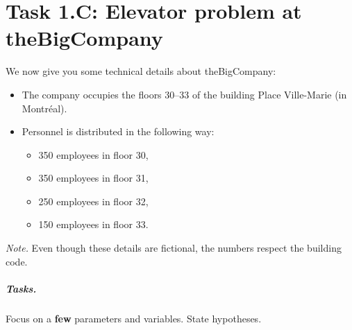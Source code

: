 %
%
%

%
%
%




\vfill





\section*{Task 1.C: Elevator problem at theBigCompany}


We now give you some technical details about theBigCompany:


\begin{itemize}
	\item The company occupies the floors 30--33 of the building Place Ville-Marie (in Montr\'eal).

	\item Personnel is distributed in the following way: 
	\begin{itemize}
		\item 350 employees in floor 30,
		\item 350 employees in floor 31,
		\item 250 employees in floor 32, 
		\item 150 employees in floor 33.
	\end{itemize}
\end{itemize}

\textsl{Note.} Even though these details are fictional, the numbers respect the building code.


\subparagraph{Tasks.} Focus on a \textbf{few} parameters and variables. State hypotheses.

